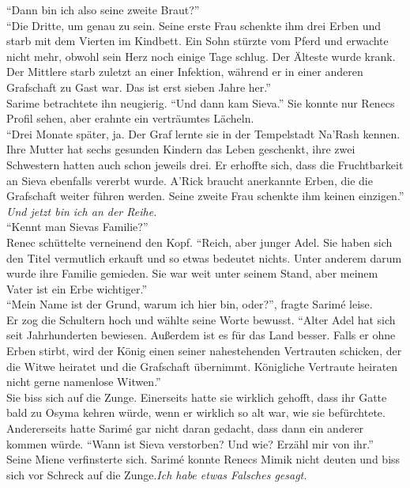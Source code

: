 ``Dann bin ich also seine zweite Braut?''\\
``Die Dritte, um genau zu sein. Seine erste Frau schenkte ihm drei Erben und starb mit dem Vierten 
im Kindbett. Ein Sohn stürzte vom Pferd und erwachte nicht mehr, obwohl sein Herz noch einige Tage 
schlug. Der Älteste wurde krank. Der Mittlere starb zuletzt an einer Infektion, während er in einer 
anderen Grafschaft zu Gast war. Das ist erst sieben Jahre her.''\\
Sarime betrachtete ihn neugierig. ``Und dann kam Sieva.'' Sie konnte nur Renecs Profil sehen, aber 
erahnte ein verträumtes Lächeln.\\
``Drei Monate später, ja. Der Graf lernte sie in der Tempelstadt Na'Rash kennen. Ihre Mutter hat 
sechs gesunden Kindern das Leben geschenkt, ihre zwei Schwestern hatten auch schon jeweils drei. Er 
erhoffte sich, dass die Fruchtbarkeit an Sieva ebenfalls vererbt wurde. A'Rick braucht anerkannte 
Erben, die die Grafschaft weiter führen werden. Seine zweite Frau schenkte ihm keinen einzigen.''\\
\textit{Und jetzt bin ich an der Reihe.}\\
``Kennt man Sievas Familie?''\\
Renec schüttelte verneinend den Kopf. ``Reich, aber junger Adel. Sie haben sich den Titel 
vermutlich erkauft und so etwas bedeutet nichts. Unter anderem darum wurde ihre 
Familie gemieden. Sie war weit unter seinem Stand, aber meinem Vater ist ein Erbe wichtiger.''\\
``Mein Name ist der Grund, warum ich hier bin, oder?'', fragte Sarimé leise.\\
Er zog die Schultern hoch und wählte seine Worte bewusst. ``Alter Adel hat sich seit Jahrhunderten 
bewiesen. Außerdem ist es für das Land besser. Falls er ohne Erben stirbt, wird der König einen 
seiner nahestehenden Vertrauten schicken, der die Witwe heiratet und die Grafschaft übernimmt. 
Königliche Vertraute heiraten nicht gerne namenlose Witwen.''\\
Sie biss sich auf die Zunge. Einerseits hatte sie wirklich gehofft, dass ihr Gatte bald zu Osyma 
kehren würde, wenn er wirklich so alt war, wie sie befürchtete. Andererseits hatte Sarimé gar nicht 
daran gedacht, dass dann ein anderer kommen würde. ``Wann ist Sieva verstorben? Und wie? Erzähl mir 
von ihr.''\\
Seine Miene verfinsterte sich. Sarimé konnte Renecs Mimik nicht deuten und biss sich vor Schreck 
auf die Zunge.\textit{Ich habe etwas Falsches gesagt.}\\
